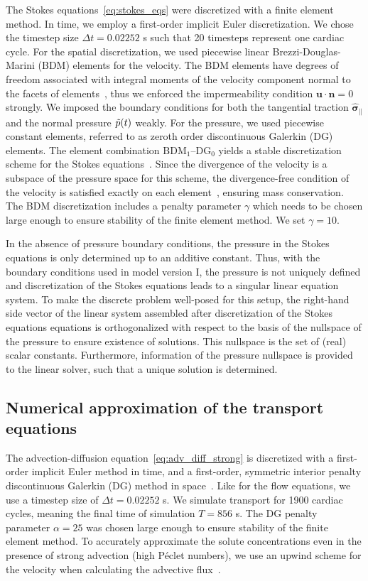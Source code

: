 \documentclass[fleqn]{wlscirep}
\newcommand{\nn}{\mathbf{n}}
\newcommand{\uu}{\mathbf{u}}
\newcommand{\bsig}{\bm{\sigma}}
\newcommand{\bsigpar}{\hat{\bsig}_{\parallel}}
\begin{document}
The Stokes equations~\eqref{eq:stokes_eqs} were discretized with a finite element method. In time, we employ a first-order implicit Euler discretization. We chose the timestep size $\Delta t = 0.02252$ s such that 20 timesteps represent one cardiac cycle. For the spatial discretization, we used piecewise linear Brezzi-Douglas-Marini (BDM) elements for the velocity. The BDM elements have degrees of freedom associated with integral moments of the velocity component normal to the facets of elements~\cite{Brezzi1985TwoProblems}, thus we enforced the impermeability condition $\uu\cdot\nn=0$ strongly. We imposed the boundary conditions for both the tangential traction $\bsigpar$ and the normal pressure $\Tilde{p}(t)$ weakly. For the pressure, we used piecewise constant elements, referred to as zeroth order discontinuous Galerkin (DG) elements. The element combination $\mathrm{BDM}_1$--$\mathrm{DG}_{0}$ yields a stable discretization scheme for the Stokes equations~\cite{Stenberg1989SomeEquations}. Since the divergence of the velocity is a subspace of the pressure space for this scheme, the divergence-free condition of the velocity is satisfied exactly on each element~\cite{Boffi2008FiniteProblem}, ensuring mass conservation. The BDM discretization includes a penalty parameter $\gamma$ which needs to be chosen large enough to ensure stability of the finite element method. We set $\gamma=10.$

In the absence of pressure boundary conditions, the pressure in the Stokes equations is only determined up to an additive constant. Thus, with the boundary conditions used in model version I, the pressure is not uniquely defined and discretization of the Stokes equations leads to a singular linear equation system. To make the discrete problem well-posed for this setup, the right-hand side vector of the linear system assembled after discretization of the Stokes equations equations is orthogonalized with respect to the basis of the nullspace of the pressure to ensure existence of solutions. This nullspace is the set of (real) scalar constants. Furthermore, information of the pressure nullspace is provided to the linear solver, such that a unique solution is determined.

\subsection*{Numerical approximation of the transport equations}
The advection-diffusion equation~\eqref{eq:adv_diff_strong} is discretized with a first-order implicit Euler method in time, and a first-order, symmetric interior penalty discontinuous Galerkin (DG) method in space~\cite{Arnold1982AnElements}. Like for the flow equations, we use a timestep size of $\Delta t = 0.02252$ s. We simulate transport for 1900 cardiac cycles, meaning the final time of simulation $T = 856$ s. The DG penalty parameter $\alpha = 25$ was chosen large enough to ensure stability of the finite element method. To accurately approximate the solute concentrations even in the presence of strong advection (high Péclet numbers), we use an upwind scheme for the velocity when calculating the advective flux~\cite{Patankar2018NumericalFlow}. 
\end{document}
